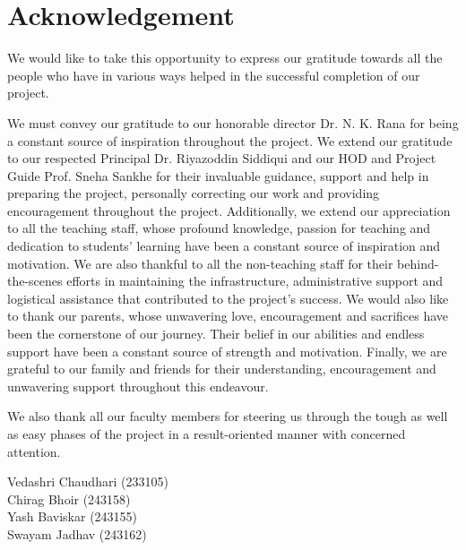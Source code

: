 \documentclass[12pt,a4paper]{report}
\begin{document}
\chapter*{Acknowledgement}
We would like to take this opportunity to express our gratitude towards all the people who have in various ways helped in the successful completion of our project.

We must convey our gratitude to our honorable director Dr. N. K. Rana for being a constant source of inspiration throughout the project. We extend our gratitude to our respected Principal Dr. Riyazoddin Siddiqui and our HOD and Project Guide Prof. Sneha Sankhe for their invaluable guidance, support and help in preparing the project, personally correcting our work and providing encouragement throughout the project. Additionally, we extend our appreciation to all the teaching staff, whose profound knowledge, passion for teaching and dedication to students' learning have been a constant source of inspiration and motivation. We are also thankful to all the non-teaching staff for their behind-the-scenes efforts in maintaining the infrastructure, administrative support and logistical assistance that contributed to the project's success. We would also like to thank our parents, whose unwavering love, encouragement and sacrifices have been the cornerstone of our journey. Their belief in our abilities and endless support have been a constant source of strength and motivation. Finally, we are grateful to our family and friends for their understanding, encouragement and unwavering support throughout this endeavour.

We also thank all our faculty members for steering us through the tough as well as easy phases of the project in a result-oriented manner with concerned attention.

\vspace{1cm}
\begin{flushright}
Vedashri Chaudhari (233105)\\
Chirag Bhoir (243158)\\
Yash Baviskar (243155)\\
Swayam Jadhav (243162)
\end{flushright}
\end{document}
